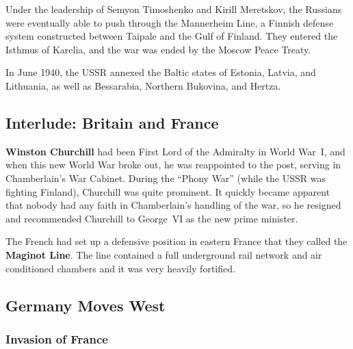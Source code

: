 Under the leadership of Semyon Timoshenko and Kirill Meretskov,
the Russians were eventually able to push through the Mannerheim Line,
a Finnish defense system constructed between Taipale and the Gulf of Finland.
They entered the Isthmus of Karelia, and the war was ended by the Moscow Peace Treaty.

In June 1940, the USSR annexed the Baltic states of Estonia, Latvia, and Lithuania,
as well as Bessarabia, Northern Bukovina, and Hertza.

\subsection*{Interlude: Britain and France}

\textbf{Winston Churchill} had been First Lord of the Admiralty in World War~I,
and when this new World War broke out, he was reappointed to the post, serving in Chamberlain's War Cabinet.
During the ``Phony War'' (while the USSR was fighting Finland), Churchill was quite prominent.
It quickly became apparent that nobody had any faith in Chamberlain's handling of the war,
so he resigned and recommended Churchill to George~VI as the new prime minister.

The French had set up a defensive position in eastern France that they called the \textbf{Maginot Line}.
The line contained a full underground rail network and air conditioned chambers and it was very heavily fortified.

\subsection*{Germany Moves West}

\subsubsection*{Invasion of France}

